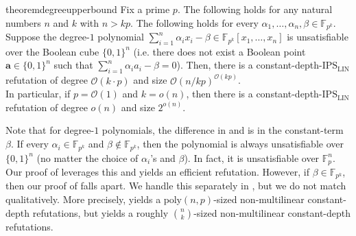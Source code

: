 \documentclass[11pt]{article}
\newtheorem{remark}[theorem]{Remark}
\newcommand{\Boo}{\{0,1 \}}
\newcommand{\bigO}{\mathcal{O}}
\newcommand{\F}{\mathbb{F}}
\renewcommand{\comment}[2]{\marginpar{\tiny{\textbf{#1: }\textit{#2}}}}
\newcommand{\vr}[1]{\comment{VR}{#1}}
\newcommand{\IPSLIN}{\mathrm{IPS}_{\mathrm{LIN}}}
\begin{document}
\begin{restatable}{theorem}{degreeupperbound}\label{thm:ub-degree}
Fix a prime $p$. The following holds for any natural numbers $n$ and $k$ with $n > kp$.\newline
The following holds for every $\alpha_{1},\ldots,\alpha_{n},\beta \in \F_{p^{k}}$. Suppose the degree-$1$ polynomial $\sum_{i=1}^{n} \alpha_{i} x_{i} - \beta \in \F_{p^{k}}[x_{1},\ldots,x_{n}]$ is unsatisfiable over the Boolean cube $\Boo^{n}$ (i.e. there does not exist a Boolean point $\mathbf{a} \in \Boo^{n}$ such that $\sum_{i=1}^{n} \alpha_{i} a_{i} - \beta = 0$).\newline
Then, there is a constant-depth-$\IPSLIN$ refutation of degree $\bigO(k \cdot p)$ and size $\bigO(n/kp)^{\bigO(kp)}$.\\

\noindent
In particular, if $p = \bigO(1)$ and $k = o(n)$, then there is a constant-depth-$\IPSLIN$ refutation of degree $o(n)$ and size $2^{o(n)}$.
\end{restatable}

\noindent
Note that for degree-$1$ polynomials, the difference in  and  is in the constant-term $\beta$. If every $\alpha_{i} \in \F_{p^{k}}$ and $\beta \notin \F_{p^{k}}$, then the polynomial is always unsatisfiable over $\Boo^{n}$ (no matter the choice of $\alpha_{i}$'s and $\beta$). In fact, it is unsatisfiable over $\F_{p}^{n}$. Our proof of  leverages this and yields an efficient refutation. However, if $\beta \in \F_{p^{k}}$, then our proof of  falls apart. We handle this separately in , but we do not match  qualitatively. More precisely,  yields a $\mathrm{poly}(n,p)$-sized non-multilinear constant-depth refutations, but  yields a roughly $\binom{n}{k}$-sized non-multilinear constant-depth refutations.

\end{document}
